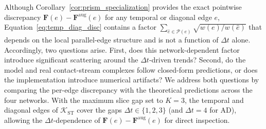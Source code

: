 \documentclass[
    pre,
    twocolumn,
    superscriptaddress,
    showpacs,
    nofootinbib,
    amsmath,
    amssymb,
    floatfix
]{revtex4-2}
\newcommand{\K}{\mathcal{K}}
\newcommand{\F}{\mathbf{F}}        %
\newcommand{\Faug}{\F^{\mathrm{aug}}}
\theoremstyle{plain} %
\theoremstyle{definition} %
\begin{document}
Although Corollary~\ref{cor:prism_specialization} provides the exact pointwise discrepancy $\F(e)-\Faug(e)$ for any temporal or diagonal edge $e$, Equation~\eqref{eq:temp_diag_disc} contains a factor $\sum_{\hat e\in\mathcal{P}(e)}\sqrt{w(e)/w(\hat e)}$ that depends on the local parallel-edge structure and is not a function of $\Delta t$ alone.
Accordingly, two questions arise.
First, does this network-dependent factor introduce significant scattering around the $\Delta t$-driven trends?
Second, do the model and real contact-stream complexes follow closed-form predictions, or does the implementation introduce numerical artifacts?
We address both questions by comparing the per-edge discrepancy with the theoretical predictions across the four networks.
With the maximum slice gap set to $K=3$, the temporal and diagonal edges of $\K_{\mathrm{ST}}$ cover the gaps $\Delta t \in \{1, 2, 3\}$ (and $\Delta t = 4$ for AD), allowing the $\Delta t$-dependence of $\F(e)-\Faug(e)$ for direct inspection.
\end{document}
